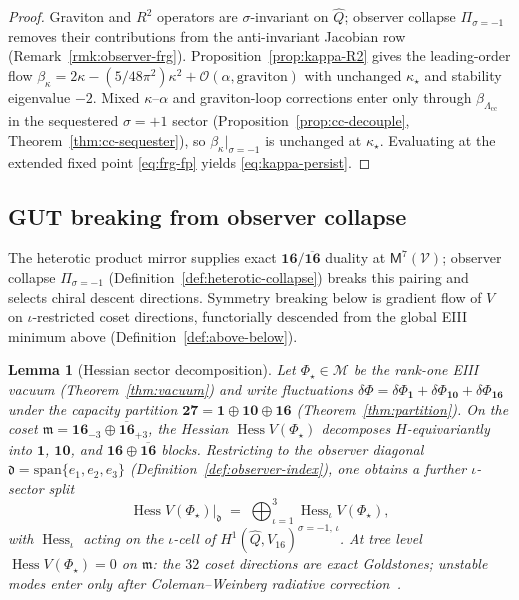 \documentclass[11pt]{article}
\theoremstyle{plain}
\newtheorem{lemma}[theorem]{Lemma}
\theoremstyle{definition}
\theoremstyle{remark}
\numberwithin{equation}{section}
\newcommand{\Void}{\mathcal{V}}
\newcommand{\Mirror}{\mathsf{M}}
\newcommand{\orderparam}{\Phi}
\newcommand{\Hess}{\operatorname{Hess}}
\begin{document}
\begin{proof}
Graviton and $R^2$ operators are $\sigma$-invariant on $\hat Q$; observer
collapse $\Pi_{\sigma=-1}$ removes their contributions from the anti-invariant
Jacobian row (Remark~\ref{rmk:observer-frg}). Proposition~\ref{prop:kappa-R2}
gives the leading-order flow
$\beta_\kappa=2\kappa-(5/48\pi^2)\kappa^2+\mathcal{O}(\alpha,\text{graviton})$
with unchanged $\kappa_\star$ and stability eigenvalue $-2$. Mixed
$\kappa$--$\alpha$ and graviton-loop corrections enter only through
$\beta_{\Lambda_{\mathrm{cc}}}$ in the sequestered $\sigma=+1$ sector
(Proposition~\ref{prop:cc-decouple}, Theorem~\ref{thm:cc-sequester}), so
$\beta_\kappa|_{\sigma=-1}$ is unchanged at $\kappa_\star$. Evaluating at the
extended fixed point \eqref{eq:frg-fp} yields \eqref{eq:kappa-persist}.
\end{proof}

\subsection{GUT breaking from observer collapse}
\label{sec:physics:breaking}

The heterotic product mirror supplies exact
$\mathbf{16}/\overline{\mathbf{16}}$ duality at $\Mirror^7(\Void)$; observer
collapse $\Pi_{\sigma=-1}$ (Definition~\ref{def:heterotic-collapse}) breaks
this pairing and selects chiral descent directions. Symmetry breaking below is
gradient flow of $V$ on $\iota$-restricted coset directions, functorially
descended from the global EIII minimum above
(Definition~\ref{def:above-below}).

\begin{lemma}[Hessian sector decomposition]\label{lem:breaking-hess}
Let $\orderparam_\star\in\mathcal{M}$ be the rank-one EIII vacuum
(Theorem~\ref{thm:vacuum}) and write fluctuations
$\delta\orderparam=\delta\orderparam_{\mathbf{1}}+\delta\orderparam_{\mathbf{10}}+\delta\orderparam_{\mathbf{16}}$
under the capacity partition
$\mathbf{27}=\mathbf{1}\oplus\mathbf{10}\oplus\mathbf{16}$
(Theorem~\ref{thm:partition}). On the coset
$\mathfrak{m}=\mathbf{16}_{-3}\oplus\overline{\mathbf{16}}_{+3}$, the Hessian
$\Hess V(\orderparam_\star)$ decomposes $H$-equivariantly into $\mathbf{1}$,
$\mathbf{10}$, and $\mathbf{16}\oplus\overline{\mathbf{16}}$ blocks. Restricting
to the observer diagonal $\mathfrak{d}=\mathrm{span}\{e_1,e_2,e_3\}$
(Definition~\ref{def:observer-index}), one obtains a further $\iota$-sector
split
\begin{equation}\label{eq:breaking-hess-iota}
  \Hess V(\orderparam_\star)\big|_{\mathfrak{d}}
  \;=\;
  \bigoplus_{\iota=1}^3 \Hess_\iota V(\orderparam_\star),
\end{equation}
with $\Hess_\iota$ acting on the $\iota$-cell of
$H^1(\hat Q,V_{16})^{\sigma=-1,\,\iota}$. At tree level
$\Hess V(\orderparam_\star)=0$ on $\mathfrak{m}$: the $32$ coset directions are
exact Goldstones; unstable modes enter only after Coleman--Weinberg radiative
correction~\cite{ColemanWeinberg1973}.
\end{lemma}
\end{document}

